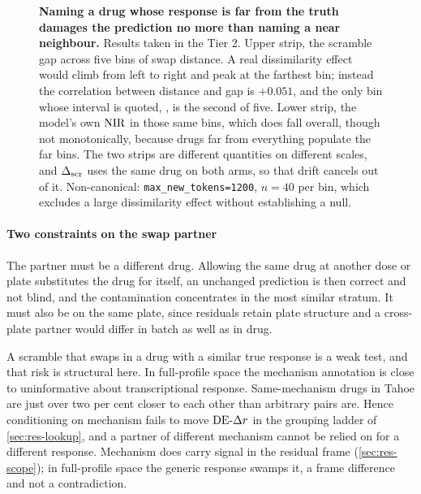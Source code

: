 \begin{figure}[htbp]
  \caption[The scramble gap does not grow with swap distance]{\textbf{Naming a
  drug whose response is far from the truth damages the prediction no more than
  naming a near neighbour.} Results taken in the Tier 2. Upper strip, the scramble gap across five bins of swap
  distance. A real dissimilarity effect would climb from left to right and peak at
  the farthest bin; instead the correlation between distance and gap is $+0.051$,
  and the only bin whose interval is quoted, , is the
  second of five. Lower strip, the model's own $\textrm{NIR}$ in those same bins, which
  does fall overall, though not monotonically, because drugs far from everything
  populate the far bins. The two strips are different quantities on different
  scales, and $\Delta_{\textrm{scr}}$ uses the same drug on both arms, so that drift cancels out of
  it. Non-canonical: \texttt{max\_new\_tokens=1200}, $n = 40$ per bin, which
  excludes a large dissimilarity effect without establishing a null.}
  \label{fig:sweepbins}
  \end{figure}

\paragraph{Two constraints on the swap partner} The partner must be a different
drug. Allowing the same drug at another dose or plate substitutes the drug for
itself, an unchanged prediction is then correct and not blind, and the contamination
concentrates in the most similar stratum. It must also be on the same plate,
since residuals retain plate structure and a cross-plate partner would differ in
batch as well as in drug.

A scramble that swaps in a drug with a similar true response is a weak test, and
that risk is structural here. In full-profile space the mechanism annotation is
close to uninformative about transcriptional response. Same-mechanism drugs in
Tahoe are just over two per cent closer to each other than arbitrary pairs
are.
Hence conditioning on mechanism fails to move $\textrm{DE-}\Delta r$ in the grouping ladder of
\cref{sec:res-lookup}, and a partner of different mechanism cannot be relied on
for a different response. Mechanism does carry signal in the residual frame
(\cref{sec:res-scope}); in full-profile space the generic response swamps it, a
frame difference and not a contradiction.

